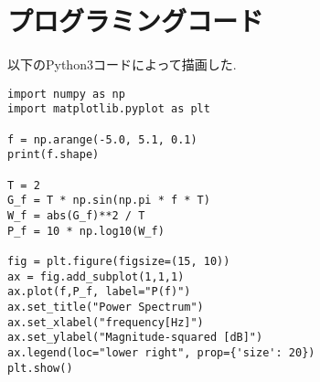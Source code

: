 \documentclass{jsarticle}	       %
\begin{document}
	
	\section{プログラミングコード}
		以下のPython3コードによって描画した.
		\begin{lstlisting}[basicstyle=\ttfamily\footnotesize, frame=single]
import numpy as np
import matplotlib.pyplot as plt

f = np.arange(-5.0, 5.1, 0.1)
print(f.shape)

T = 2
G_f = T * np.sin(np.pi * f * T)
W_f = abs(G_f)**2 / T
P_f = 10 * np.log10(W_f)

fig = plt.figure(figsize=(15, 10))
ax = fig.add_subplot(1,1,1)
ax.plot(f,P_f, label="P(f)")
ax.set_title("Power Spectrum")
ax.set_xlabel("frequency[Hz]")
ax.set_ylabel("Magnitude-squared [dB]")
ax.legend(loc="lower right", prop={'size': 20})
plt.show()
		\end{lstlisting}
		


		

	\printindex
\end{document}
